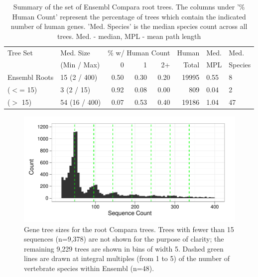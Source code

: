\begin{table}[hb] \footnotesize
\centering
\begin{tabular}{lb{3cm}rrrrb{1cm}b{1cm}}
\toprule
Tree Set & Med. Size & \multicolumn{3}{c}{\% w/ Human Count} & Human & Med. & Med. \\ \cmidrule(r){3-5}
  & (Min / Max) & 0 & 1 & 2+ & Total & MPL & Species \\ 
  \midrule
Ensembl Roots & 15 (2 / 400) & 0.50 & 0.30 & 0.20 & 19995 & 0.55 & 8 \\ 
($<$= 15) & 3 (2 / 15) & 0.92 & 0.08 & 0.00 & 809 & 0.04 & 2 \\ 
($>$ 15) & 54 (16 / 400) & 0.07 & 0.53 & 0.40 & 19186 & 1.04 & 47 \\ 
   \bottomrule
\end{tabular}
\caption{Summary of the set of Ensembl Compara root trees. The columns
  under '\% Human Count' represent the percentage of trees which
  contain the indicated number of human genes. 'Med. Species' is the
  median species count across all trees. Med. - median, MPL - mean
  path length }
\label{ensembl_root_table}
\end{table}


\begin{figure}[t]
\centering
\includegraphics[scale=0.9]{Figs/ensembl_roots_hist.pdf}
\caption{Gene tree sizes for the root Compara trees. Trees with fewer
  than 15 sequences (n=9,378) are not shown for the purpose of
  clarity; the remaining 9,229 trees are shown in bins of width
  5. Dashed green lines are drawn at integral multiples (from 1 to 5)
  of the number of vertebrate species within Ensembl (n=48).}
\label{ensembl_roots_hist}
\end{figure}



